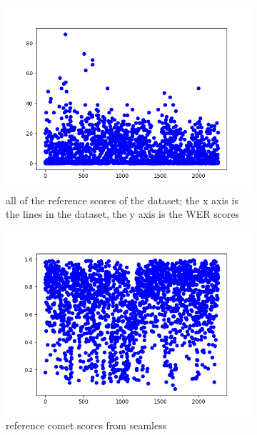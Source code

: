 \begin{figure}[ht]
    \centering
    \begin{subfigure}{0.6\textwidth}
    \includegraphics[width=\linewidth]{Latex/sections/images/seamlesswerref.png}
    \caption{all of the reference scores of the dataset; the x axis is the lines in the dataset, the y axis is the WER scores}
    \end{subfigure}
    \begin{subfigure}{0.6\textwidth}
        \includegraphics[width=\linewidth]{Latex/sections/images/seamlessreferences.png}
        \caption{reference comet scores from seamless}
    \end{subfigure}
    \begin{subfigure}{0.6\textwidth}

\end{subfigure}
\end{figure}
